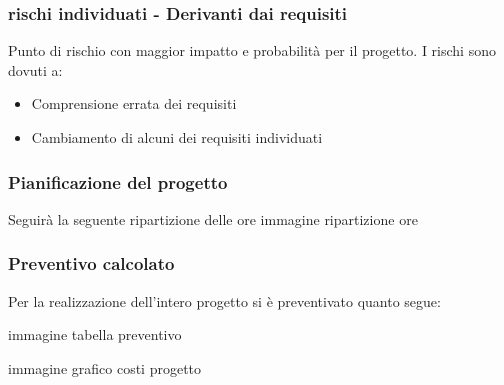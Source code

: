\begin{frame}
  \frametitle{rischi individuati - Derivanti dai requisiti}
    Punto di rischio con maggior impatto e probabilità per il progetto.
    I rischi sono dovuti a:
    \begin{itemize}
    \item Comprensione errata dei requisiti
    \item Cambiamento di alcuni dei requisiti individuati
    \end{itemize}    
\end{frame}

\begin{frame}
  \frametitle{Pianificazione del progetto}
  Seguirà la seguente ripartizione delle ore
  immagine ripartizione ore
\end{frame}

\begin{frame}
  \frametitle{Preventivo calcolato}
  Per la realizzazione dell'intero progetto si è preventivato quanto segue:

  immagine tabella preventivo

  immagine grafico costi progetto
\end{frame}


